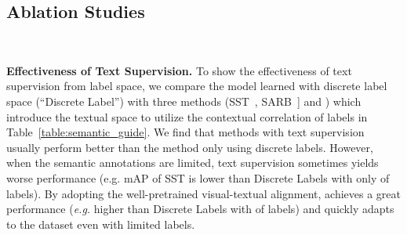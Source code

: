 \subsection{Ablation Studies}



\begin{table}
    \begin{center}
     \caption{\small \textbf{Comparison among methods on MS-COCO using partial labels with the same initialization. All methods use parameters pretrained by CLIP~\cite{radford2021learning}.}}~\label{table:semantic_guide}
    \end{center}
\vspace{-10pt}
\end{table} \textbf{Effectiveness of Text Supervision.} To show the effectiveness of text supervision from label space, we compare the model learned with discrete label space (``Discrete Label'') with three methods (SST~\cite{chen2022structured}, SARB~\cite{pu2022semantic}] and  \ours) which introduce the textual space to utilize the contextual correlation of labels in Table~\ref{table:semantic_guide}. We find that methods with text supervision usually perform better than the method only using discrete labels. However, when the semantic annotations are limited, text supervision sometimes yields worse performance (e.g. mAP of SST is  lower than Discrete Labels with only  of labels). By adopting the well-pretrained visual-textual alignment, \ours achieves a great performance (\textit{e.g.}  higher than Discrete Labels with  of labels) and quickly adapts to the dataset even with limited labels.

